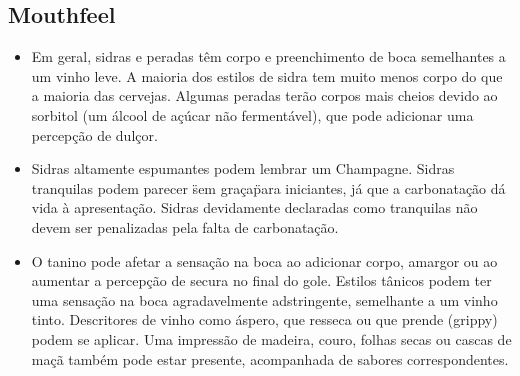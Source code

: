\subsection*{Mouthfeel}
\begin{itemize}
\item Em geral, sidras e peradas têm corpo e preenchimento de boca semelhantes a um vinho leve. A maioria dos estilos de sidra tem muito menos corpo do que a maioria das cervejas. Algumas peradas terão corpos mais cheios devido ao sorbitol (um álcool de açúcar não fermentável), que pode adicionar uma percepção de dulçor.
\item Sidras altamente espumantes podem lembrar um Champagne. Sidras tranquilas podem parecer \"sem graça\" para iniciantes, já que a carbonatação dá vida à apresentação. Sidras devidamente declaradas como tranquilas não devem ser penalizadas pela falta de carbonatação.
\item O tanino pode afetar a sensação na boca ao adicionar corpo, amargor ou ao aumentar a percepção de secura no final do gole. Estilos tânicos podem ter uma sensação na boca agradavelmente adstringente, semelhante a um vinho tinto. Descritores de vinho como áspero, que resseca ou que prende (grippy) podem se aplicar. Uma impressão de madeira, couro, folhas secas ou cascas de maçã também pode estar presente, acompanhada de sabores correspondentes.
\end{itemize}
